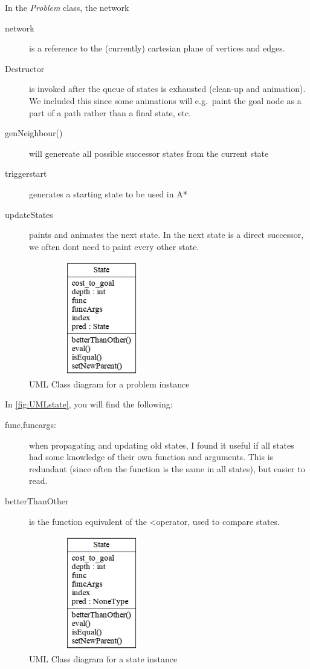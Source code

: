 \documentclass[journal]{IEEEtran}
\begin{document}
In the \textit{Problem} class, the network 
\begin{description}
    \item[network] is a reference to the (currently) cartesian
    plane of vertices and edges. 
    \item[Destructor] is invoked after the queue of states is exhausted (clean-up and animation).
        We included this since some animations will e.g.\ paint the goal node as
        a part of a path rather than a final state, etc.
    \item[genNeighbour()] will genereate all possible successor states
        from the current state
    \item[triggerstart] generates a starting state to be used in A*
    \item[updateStates] paints and animates the next state. In the next state
        is a direct successor, we often dont need to paint every other state.
\end{description}

\begin{figure}[Hb]
\centering
\includegraphics[height=5cm,keepaspectratio,width=2.5in]{fig/problem.png}%
\caption{UML Class diagram for a problem instance}
\label{fig:UMLproblem}
\end{figure}

In \autoref{fig:UMLstate}, you will find the following:
\begin{description}
    \item[func,funcargs:] when propagating and updating old states, I found it
        useful if all states had some knowledge of their own function and arguments.
        This is redundant (since often the function is the same in all states),
        but easier to read.
    \item[betterThanOther] is the function equivalent of the \textless operator,
        used to compare states.
\end{description}


\begin{figure}[Hb]
\centering
\includegraphics[height=5cm,keepaspectratio,width=2.5in]{fig/state.png}%
\caption{UML Class diagram for a state instance}
\label{fig:UMLstate}
\end{figure}
\end{document}
